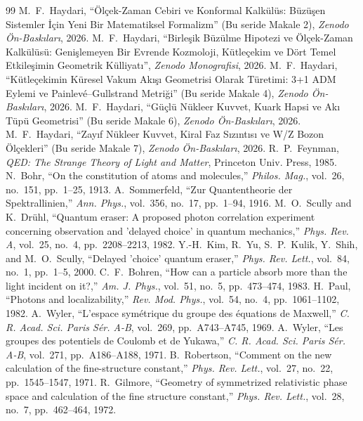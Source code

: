 \documentclass[11pt,a4paper]{article}
\begin{document}
\begin{thebibliography}{99}
     M.~F.~Haydari, ``Ölçek-Zaman Cebiri ve Konformal Kalkülüs: Büzüşen Sistemler İçin Yeni Bir Matematiksel Formalizm'' (Bu seride Makale 2), \textit{Zenodo Ön-Baskıları}, 2026.
     M.~F.~Haydari, ``Birleşik Büzülme Hipotezi ve Ölçek-Zaman Kalkülüsü: Genişlemeyen Bir Evrende Kozmoloji, Kütleçekim ve Dört Temel Etkileşimin Geometrik Külliyatı'', \textit{Zenodo Monografisi}, 2026.
     M.~F.~Haydari, ``Kütleçekimin Küresel Vakum Akışı Geometrisi Olarak Türetimi: 3+1 ADM Eylemi ve Painlevé--Gullstrand Metriği'' (Bu seride Makale 4), \textit{Zenodo Ön-Baskıları}, 2026.
     M.~F.~Haydari, ``Güçlü Nükleer Kuvvet, Kuark Hapsi ve Akı Tüpü Geometrisi'' (Bu seride Makale 6), \textit{Zenodo Ön-Baskıları}, 2026.
     M.~F.~Haydari, ``Zayıf Nükleer Kuvvet, Kiral Faz Sızıntısı ve W/Z Bozon Ölçekleri'' (Bu seride Makale 7), \textit{Zenodo Ön-Baskıları}, 2026.
     R.~P.~Feynman, \textit{QED: The Strange Theory of Light and Matter}, Princeton Univ. Press, 1985.
     N.~Bohr, ``On the constitution of atoms and molecules,'' \textit{Philos. Mag.}, vol.~26, no.~151, pp.~1--25, 1913.
     A.~Sommerfeld, ``Zur Quantentheorie der Spektrallinien,'' \textit{Ann. Phys.}, vol.~356, no.~17, pp.~1--94, 1916.
     M.~O.~Scully and K.~Dr\"uhl, ``Quantum eraser: A proposed photon correlation experiment concerning observation and 'delayed choice' in quantum mechanics,'' \textit{Phys. Rev. A}, vol.~25, no.~4, pp.~2208--2213, 1982.
     Y.-H.~Kim, R.~Yu, S.~P.~Kulik, Y.~Shih, and M.~O.~Scully, ``Delayed 'choice' quantum eraser,'' \textit{Phys. Rev. Lett.}, vol.~84, no.~1, pp.~1--5, 2000.
     C.~F.~Bohren, ``How can a particle absorb more than the light incident on it?,'' \textit{Am. J. Phys.}, vol.~51, no.~5, pp.~473--474, 1983.
     H.~Paul, ``Photons and localizability,'' \textit{Rev. Mod. Phys.}, vol.~54, no.~4, pp.~1061--1102, 1982.
     A.~Wyler, ``L'espace sym\'etrique du groupe des \'equations de Maxwell,'' \textit{C. R. Acad. Sci. Paris S\'er. A-B}, vol.~269, pp.~A743--A745, 1969.
     A.~Wyler, ``Les groupes des potentiels de Coulomb et de Yukawa,'' \textit{C. R. Acad. Sci. Paris S\'er. A-B}, vol.~271, pp.~A186--A188, 1971.
     B.~Robertson, ``Comment on the new calculation of the fine-structure constant,'' \textit{Phys. Rev. Lett.}, vol.~27, no.~22, pp.~1545--1547, 1971.
     R.~Gilmore, ``Geometry of symmetrized relativistic phase space and calculation of the fine structure constant,'' \textit{Phys. Rev. Lett.}, vol.~28, no.~7, pp.~462--464, 1972.
\end{thebibliography}
\end{document}
